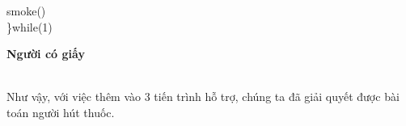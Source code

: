 {\begin{minipage}[t]{.29\linewidth}
{\begin{minipage}[t]{\linewidth}
        \hspace*{10pt}smoke()\\
    \}while(1)
    \end{minipage}
    }
\end{minipage}
\hfill
\begin{minipage}[t]{.29\linewidth}
    \begin{center}
        {\bfseries Người có giấy}
    \end{center}
\end{minipage}
}\\[7pt]
Như vậy, với việc thêm vào 3 tiến trình hỗ trợ, chúng ta đã giải quyết được bài toán người hút thuốc.
